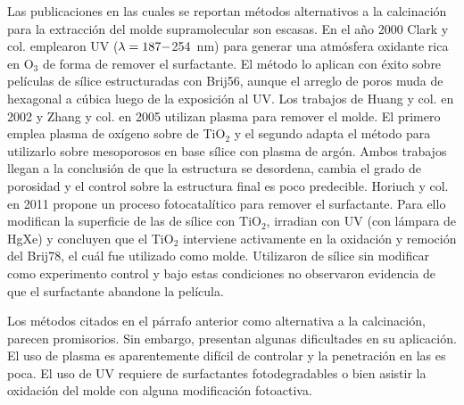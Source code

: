 	Las publicaciones en las cuales se reportan métodos alternativos a la calcinación para la extracción del molde supramolecular son escasas. En el año 2000 Clark y col.\cite{Clark2000} emplearon UV ($\lambda\index{longitud de onda}=187-$\SI{254}{\nm}) para generar una atmósfera oxidante rica en O$_3$ de forma de remover el surfactante. El método lo aplican con éxito sobre películas de sílice estructuradas con Brij56, aunque el arreglo de poros muda de hexagonal a cúbica luego de la exposición al UV. Los trabajos de Huang y col. en 2002\cite{Huang2002} y Zhang y col. en 2005\cite{Zhang2005} utilizan plasma para remover el molde. El primero emplea plasma de oxígeno sobre \pdm\space de TiO$_2$ y el segundo adapta el método para utilizarlo sobre mesoporosos en base sílice con plasma de argón. Ambos trabajos llegan a la conclusión de que la estructura se desordena, cambia el grado de porosidad y el control sobre la estructura final es poco predecible. Horiuch y col.\cite{Horiuchi2011} en 2011 propone un proceso fotocatalítico para remover el surfactante. Para ello modifican la superficie de las \pdm\space de sílice con TiO$_2$, irradian con UV (con lámpara de HgXe) y concluyen que el TiO$_2$ interviene activamente en la oxidación y remoción del Brij78, el cuál fue utilizado como molde. Utilizaron \pdm\space de sílice sin modificar como experimento control y bajo estas condiciones no observaron evidencia de que el surfactante abandone la película.

	Los métodos citados en el párrafo anterior como alternativa a la calcinación, parecen promisorios. Sin embargo, presentan algunas dificultades en su aplicación. El uso de plasma es aparentemente difícil de controlar y la penetración en las \pdm\space es poca. El uso de UV requiere de surfactantes fotodegradables o bien asistir la oxidación del molde con alguna modificación fotoactiva.


